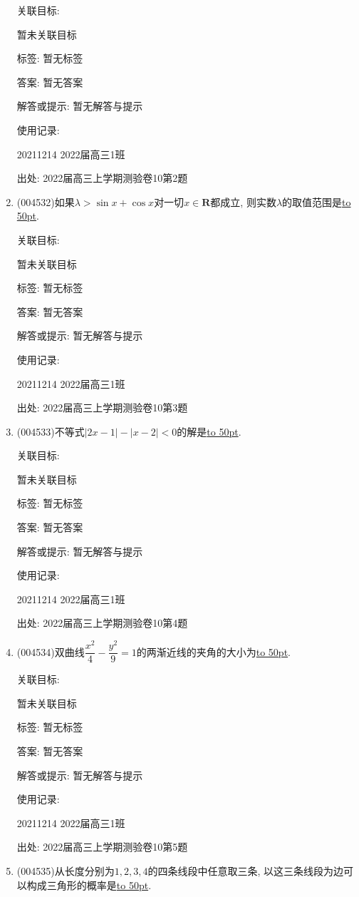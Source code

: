 \documentclass[10pt,a4paper]{article}
\newcommand{\blank}[1]{\underline{\hbox to #1pt{}}}
\begin{document}
\begin{enumerate}[1.]
关联目标:

暂未关联目标



标签: 暂无标签

答案: 暂无答案

解答或提示: 暂无解答与提示

使用记录:

20211214	2022届高三1班	


出处: 2022届高三上学期测验卷10第2题
\item { (004532)}如果$\lambda>\sin x+\cos x$对一切$x\in\mathbf{R}$都成立, 则实数$\lambda$的取值范围是\blank{50}.


关联目标:

暂未关联目标



标签: 暂无标签

答案: 暂无答案

解答或提示: 暂无解答与提示

使用记录:

20211214	2022届高三1班	


出处: 2022届高三上学期测验卷10第3题
\item { (004533)}不等式$|2x-1|-|x-2|<0$的解是\blank{50}.


关联目标:

暂未关联目标



标签: 暂无标签

答案: 暂无答案

解答或提示: 暂无解答与提示

使用记录:

20211214	2022届高三1班	


出处: 2022届高三上学期测验卷10第4题
\item { (004534)}双曲线$\dfrac{x^2}4-\dfrac{y^2}9=1$的两渐近线的夹角的大小为\blank{50}.


关联目标:

暂未关联目标



标签: 暂无标签

答案: 暂无答案

解答或提示: 暂无解答与提示

使用记录:

20211214	2022届高三1班	


出处: 2022届高三上学期测验卷10第5题
\item { (004535)}从长度分别为$1,2,3,4$的四条线段中任意取三条, 以这三条线段为边可以构成三角形的概率是\blank{50}.



\end{enumerate}
\end{document}
